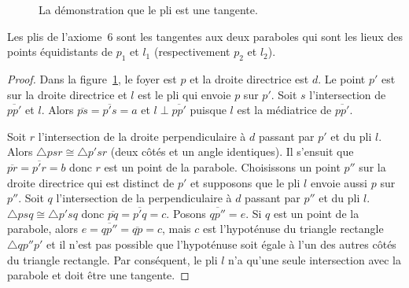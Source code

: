 \begin{figure}[htbp]
\centering
{}

\caption{La démonstration que le pli est une tangente.}\label{f.tangent-proof}
\end{figure}

\begin{theorem}\label{thm.parabola-tangents}
Les plis de l'axiome~$6$ sont les tangentes aux deux paraboles qui sont les lieux des points équidistants de $p_1$ et $l_1$ (respectivement $p_2$ et $l_2$).
\end{theorem}
\begin{proof}
Dans la figure~\ref{f.tangent-proof}, le foyer est $p$ et la droite directrice est $d$. Le point $p'$ est  sur la droite directrice et $l$ est le pli qui envoie $p$ sur $p'$. Soit $s$ l'intersection de $\overline{pp'}$ et $l$. Alors $\overline{ps}=\overline{p's}=a$ et $l\perp \overline{pp'}$ puisque $l$ est la médiatrice de $\overline{pp'}$.

Soit $r$ l'intersection de la droite perpendiculaire à $d$ passant par $p'$ et du pli $l$. Alors $\triangle psr\cong \triangle p'sr$ (deux côtés et un angle identiques). Il s'ensuit que 
$\overline{pr}=\overline{p'r}=b$ donc $r$ est un point de la parabole. Choisissons un point $p''$ sur la droite directrice qui est distinct de $p'$ et supposons que le pli $l$ envoie aussi $p$ sur $p''$. Soit $q$ l'intersection de la perpendiculaire à $d$ passant par $p''$ et du pli $l$. $\triangle psq\cong \triangle p'sq$ donc $\overline{pq}=\overline{p'q}=c$. Posons $\overline{qp''}=e$. Si $q$ est un point de la parabole, alors $e=\overline{qp''}=\overline{qp}=c$, mais $c$ est l'hypoténuse du triangle rectangle $\triangle qp''p'$ et il n'est pas possible que l'hypoténuse soit égale à l'un des autres côtés du triangle rectangle. Par conséquent, le pli $l$ n'a qu'une seule intersection avec la parabole et doit être une tangente.
\end{proof}

